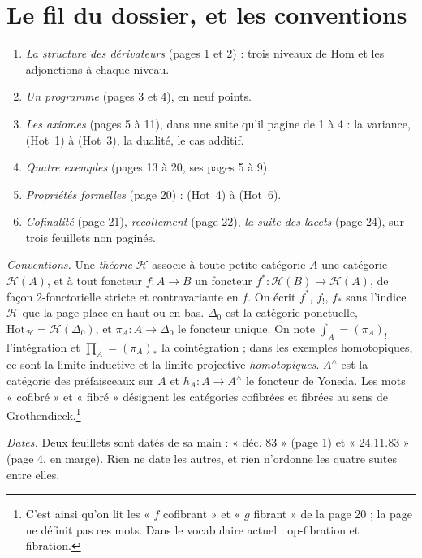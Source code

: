 \documentclass[11pt,a4paper]{article}
\begin{document}
\section*{Le fil du dossier, et les conventions}

\begin{enumerate}
\item[1.] \emph{La structure des dérivateurs} (pages 1 et 2) : trois
niveaux de $\mathrm{Hom}$ et les adjonctions à chaque niveau.
\item[2.] \emph{Un programme} (pages 3 et 4), en neuf points.
\item[3.] \emph{Les axiomes} (pages 5 à 11), dans une suite qu'il pagine de 1
à 4 : la variance, (Hot~1) à (Hot~3), la dualité, le cas additif.
\item[4.] \emph{Quatre exemples} (pages 13 à 20, ses pages 5 à 9).
\item[5.] \emph{Propriétés formelles} (page 20) : (Hot~4) à (Hot~6).
\item[6.] \emph{Cofinalité} (page 21), \emph{recollement} (page 22),
\emph{la suite des lacets} (page 24), sur trois feuillets non paginés.
\end{enumerate}

\emph{Conventions.} Une \emph{théorie} $\mathcal H$ associe à toute petite
catégorie $A$ une catégorie $\mathcal H(A)$, et à tout foncteur $f : A \to B$
un foncteur $f^{*} : \mathcal H(B) \to \mathcal H(A)$, de façon
2-fonctorielle stricte et contravariante en $f$. On écrit $f^{*}$, $f_{!}$,
$f_{*}$ sans l'indice $\mathcal H$ que la page place en haut ou en bas.
$\Delta_0$ est la catégorie ponctuelle, $\mathrm{Hot}_{\mathcal H} =
\mathcal H(\Delta_0)$, et $\pi_A : A \to \Delta_0$ le foncteur unique. On
note $\int_A = (\pi_A)_{!}$ l'intégration et $\prod_A = (\pi_A)_{*}$ la
cointégration ; dans les exemples homotopiques, ce sont la limite inductive
et la limite projective \emph{homotopiques}. $A^{\wedge}$ est la catégorie
des préfaisceaux sur $A$ et $h_A : A \to A^{\wedge}$ le foncteur de Yoneda.
Les mots « cofibré » et « fibré » désignent les catégories cofibrées et
fibrées au sens de Grothendieck.\footnote{C'est ainsi qu'on lit les
« $f$ cofibrant » et « $g$ fibrant » de la page 20 ; la page ne définit pas
ces mots. Dans le vocabulaire actuel : op-fibration et fibration.}

\emph{Dates.} Deux feuillets sont datés de sa main : « déc. 83 » (page 1) et
« 24.11.83 » (page 4, en marge). Rien ne date les autres, et rien n'ordonne
les quatre suites entre elles.
\end{document}
